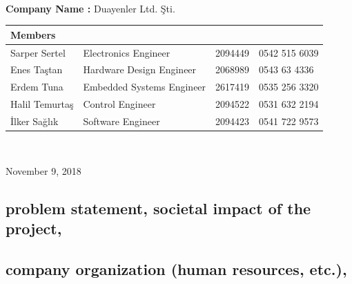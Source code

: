 \documentclass[a4paper,12pt]{article}
\newcommand{\blankpage}{
	\- \\[9cm]	
	{ \centering \textit{This page intentionally left blank.} \par }
	\- \\[9cm]
}%
\begin{document}
\begin{titlepage}
\begin{minipage}[r]{0.35\textwidth}
\end{minipage}\\[1cm]
\begin{minipage}{\textwidth}
	\begin{flushleft}
		\large{\textbf{Company Name :}}	Duayenler Ltd. Şti.\\
		\begin{table}[H]
			\begin{tabular}{l l l l}
				\hline
				\textbf{Members} \\ \hline
				Sarper Sertel & Electronics Engineer& 2094449 & 0542 515 6039  \\ 
				Enes Taştan & Hardware Design Engineer & 2068989 & 0543 63 4336  \\ 
				Erdem Tuna & Embedded Systems Engineer& 2617419 & 0535 256 3320  \\ 
				Halil Temurtaş & Control Engineer& 2094522 & 0531 632 2194  \\
				İlker Sağlık & Software Engineer& 2094423 & 0541 722 9573  \\ \hline
				
				
			\end{tabular}
		\end{table}
	\end{flushleft}
\end{minipage}\\[1cm]

\begin{flushbottom}
{\large November 9, 2018} %
\end{flushbottom}

\end{titlepage}

\tableofcontents
\newpage



	
\subsection{problem statement, societal impact of the project,}

\subsection{company organization (human resources, etc.),}
\end{document}
